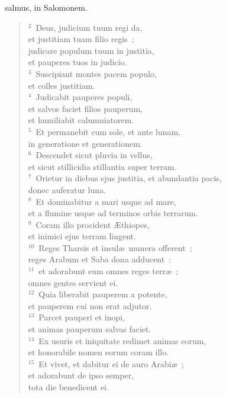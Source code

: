 \bchapter
{}salmus, in Salomonem.
\begin{flushleft}\begin{verse}\vspace{6pt}${}^{2}$~Deus, judicium tuum regi da,\\ et justitiam tuam filio regis~;\\ judicare populum tuum in justitia,\\ et pauperes tuos in judicio.\\
${}^{3}$~Suscipiant montes pacem populo,\\ et colles justitiam.\\
${}^{4}$~Judicabit pauperes populi,\\ et salvos faciet filios pauperum,\\ et humiliabit calumniatorem.\\
${}^{5}$~Et permanebit cum sole, et ante lunam,\\ in generatione et generationem.\\
${}^{6}$~Descendet sicut pluvia in vellus,\\ et sicut stillicidia stillantia super terram.\\
${}^{7}$~Orietur in diebus ejus justitia, et abundantia pacis,\\ donec auferatur luna.\\
${}^{8}$~Et dominabitur a mari usque ad mare,\\ et a flumine usque ad terminos orbis terrarum.\\
${}^{9}$~Coram illo procident \AE thiopes,\\ et inimici ejus terram lingent.\\
${}^{10}$~Reges Tharsis et insul\ae\ munera offerent~;\\ reges Arabum et Saba dona adducent~:\\
${}^{11}$~et adorabunt eum omnes reges terr\ae~;\\ omnes gentes servient ei.\\
${}^{12}$~Quia liberabit pauperem a potente,\\ et pauperem cui non erat adjutor.\\
${}^{13}$~Parcet pauperi et inopi,\\ et animas pauperum salvas faciet.\\
${}^{14}$~Ex usuris et iniquitate redimet animas eorum,\\ et honorabile nomen eorum coram illo.\\
${}^{15}$~Et vivet, et dabitur ei de auro Arabi\ae~;\\ et adorabunt de ipso semper,\\ tota die benedicent ei.\\

\end{verse}
\end{flushleft}
